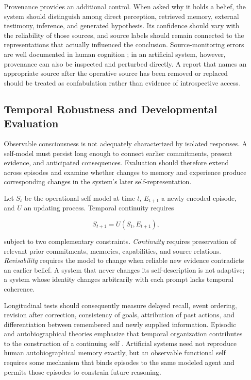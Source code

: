 Provenance provides an additional control. When asked why it holds a belief, the system should distinguish among direct perception, retrieved memory, external testimony, inference, and generated hypothesis. Its confidence should vary with the reliability of those sources, and source labels should remain connected to the representations that actually influenced the conclusion. Source-monitoring errors are well documented in human cognition \cite{johnson1993source}; in an artificial system, however, provenance can also be inspected and perturbed directly. A report that names an appropriate source after the operative source has been removed or replaced should be treated as confabulation rather than evidence of introspective access.

\subsection{Temporal Robustness and Developmental Evaluation}

Observable consciousness is not adequately characterized by isolated responses. A self-model must persist long enough to connect earlier commitments, present evidence, and anticipated consequences. Evaluation should therefore extend across episodes and examine whether changes to memory and experience produce corresponding changes in the system's later self-representation.

Let $S_t$ be the operational self-model at time $t$, $E_{t+1}$ a newly encoded episode, and $U$ an updating process. Temporal continuity requires

\begin{equation}
S_{t+1}
=
U(S_t,E_{t+1}),
\label{eq:self-model-update}
\end{equation}

subject to two complementary constraints. \emph{Continuity} requires preservation of relevant prior commitments, memories, capabilities, and source relations. \emph{Revisability} requires the model to change when reliable new evidence contradicts an earlier belief. A system that never changes its self-description is not adaptive; a system whose identity changes arbitrarily with each prompt lacks temporal coherence.

Longitudinal tests should consequently measure delayed recall, event ordering, revision after correction, consistency of goals, attribution of past actions, and differentiation between remembered and newly supplied information. Episodic and autobiographical theories emphasize that temporal organization contributes to the construction of a continuing self \cite{tulving2002episodic,conway2000autobiographical}. Artificial systems need not reproduce human autobiographical memory exactly, but an observable functional self requires some mechanism that binds episodes to the same modeled agent and permits those episodes to constrain future reasoning.

